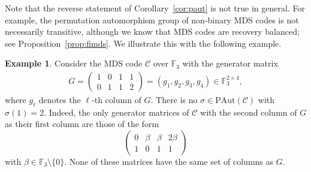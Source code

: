 \documentclass[11pt,a4paper,reqno,twoside]{amsart}
\theoremstyle{definition}
\newtheorem{example}{Example}
\newcommand{\F}{\mathbb{F}}
\newcommand{\mC}{\mathcal{C}}
\newcommand\alb[1]{{{\textcolor{red}{Alberto: #1}}}}
\newcommand{\rcomment}[1]{{\color{red}#1}}
\newcommand{\pcomment}[1]{{\color{purple}#1}}
\newcommand{\vcomment}[1]{{\color{violet}#1}}
\newcommand{\brcomment}[1]{{\color{BrickRed}#1}}
\newcommand{\ag}[1]{{\footnotesize [\brcomment{#1}\;\;\rcomment{--Anina}]}}
\newcommand{\ey}[1]{{{\footnotesize [\pcomment{#1}\;\;\vcomment{--Eitan}]}}}
\begin{document}
Note that the reverse statement of Corollary~\ref{cor:paut} is not true in general. For example, the permutation automorphism group of non-binary MDS codes is not necessarily transitive, although we know that MDS codes are recovery balanced; see Proposition~\ref{prop:fimds}. We illustrate this with the following example. %



\begin{example}
Consider the MDS code $\mathcal{C}$ over $\mathbb{F}_3$ with the generator matrix 
\begin{align*}
G = \begin{pmatrix}
1 & 0 & 1 & 1 \\
0 & 1 & 1 & 2
\end{pmatrix} = (g_1, g_2, g_3, g_4) \in \mathbb{F}_3^{2 \times 4},
\end{align*}
where $g_{\ell}$ denotes the $\ell$-th column of $G$.
There is no $\sigma \in \mathrm{PAut}(\mathcal{C})$ with $\sigma(1) = 2$. Indeed, the only generator matrices of $\mC$ with the second column of $G$ as their first column are those of the form
$$\begin{pmatrix}
0 & \beta & \beta & 2\beta \\
1 & 0 & 1 & 1
\end{pmatrix}$$
with $\beta \in \F_3\setminus \{0\}$. None of these matrices have the same set of columns as $G$.
\end{example}
\end{document}
